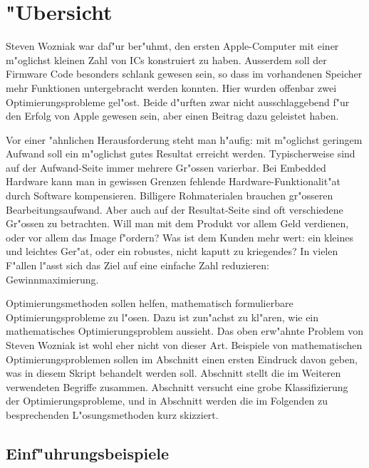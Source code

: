 \chapter{"Ubersicht}
Steven Wozniak war daf"ur ber"uhmt, den ersten Apple-Computer mit
einer m"oglichst kleinen Zahl von ICs konstruiert zu haben.
Ausserdem soll der Firmware Code besonders schlank gewesen sein, so
dass im vorhandenen Speicher mehr Funktionen untergebracht werden 
konnten. Hier wurden offenbar zwei Optimierungsprobleme gel"ost.
Beide d"urften zwar nicht ausschlaggebend f"ur den Erfolg von
Apple gewesen sein, aber einen Beitrag dazu geleistet haben.

Vor einer "ahnlichen Herausforderung steht man h"aufig: mit m"oglichst
geringem Aufwand soll ein m"oglichst gutes Resultat erreicht werden.
Typischerweise sind auf der Aufwand-Seite immer mehrere Gr"ossen varierbar.
Bei Embedded Hardware kann man in gewissen Grenzen
fehlende Hardware-Funktionalit"at durch Software kompensieren.
Billigere Rohmaterialen brauchen gr"osseren Bearbeitungsaufwand.
Aber auch auf der Resultat-Seite sind oft verschiedene Gr"ossen zu
betrachten.
Will man mit dem Produkt vor allem Geld verdienen, oder vor allem
das Image f"ordern?
Was ist dem Kunden mehr wert: ein kleines und leichtes
Ger"at, oder ein robustes, nicht kaputt zu kriegendes? 
In vielen F"allen l"asst sich das Ziel auf eine einfache
Zahl reduzieren: Gewinnmaximierung.

Optimierungsmethoden sollen helfen, mathematisch formulierbare
Optimierungsprobleme zu l"osen. Dazu ist zun"achst zu kl"aren,
wie ein mathematisches Optimierungsproblem aussieht.
Das oben erw"ahnte Problem von Steven Wozniak ist wohl eher nicht
von dieser Art. Beispiele von mathematischen Optimierungsproblemen
sollen im Abschnitt \label{section-einfuehrungsbeispiele} einen
ersten Eindruck davon geben, was in diesem Skript behandelt werden soll.
Abschnitt \label{section-begriffe} stellt die im Weiteren verwendeten
Begriffe zusammen. Abschnitt \label{section-klassifizierung} versucht
eine grobe Klassifizierung der Optimierungsprobleme, und in Abschnitt
\label{section-loesungsuebersicht} werden die im Folgenden zu
besprechenden L"osungsmethoden kurz skizziert.

\section{Einf"uhrungsbeispiele\label{section-einfuehrungsbeispiele}}

